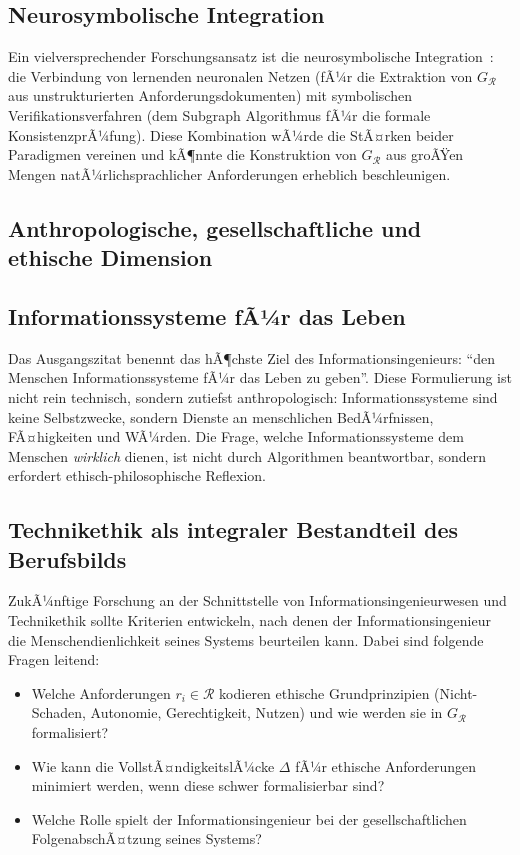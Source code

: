 ﻿\documentclass[a4paper,12pt]{report}
\theoremstyle{definition}
\begin{document}
\subsection{Neurosymbolische Integration}

Ein vielversprechender Forschungsansatz ist die neurosymbolische Integration~\cite{lamb2020}:
die Verbindung von lernenden neuronalen Netzen (fÃ¼r die Extraktion von $G_\mathcal{R}$
aus unstrukturierten Anforderungsdokumenten) mit symbolischen Verifikationsverfahren
(dem Subgraph Algorithmus fÃ¼r die formale KonsistenzprÃ¼fung). Diese Kombination
wÃ¼rde die StÃ¤rken beider Paradigmen vereinen und kÃ¶nnte die Konstruktion von
$G_\mathcal{R}$ aus groÃŸen Mengen natÃ¼rlichsprachlicher Anforderungen erheblich
beschleunigen.

\subsection{Anthropologische, gesellschaftliche und ethische Dimension}

\subsection{Informationssysteme fÃ¼r das Leben}

Das Ausgangszitat benennt das hÃ¶chste Ziel des Informationsingenieurs:
\enquote{den Menschen Informationssysteme fÃ¼r das Leben zu geben}. Diese Formulierung
ist nicht rein technisch, sondern zutiefst anthropologisch: Informationssysteme
sind keine Selbstzwecke, sondern Dienste an menschlichen BedÃ¼rfnissen, FÃ¤higkeiten
und WÃ¼rden. Die Frage, welche Informationssysteme dem Menschen \emph{wirklich} dienen,
ist nicht durch Algorithmen beantwortbar, sondern erfordert ethisch-philosophische
Reflexion.

\subsection{Technikethik als integraler Bestandteil des Berufsbilds}

ZukÃ¼nftige Forschung an der Schnittstelle von Informationsingenieurwesen und Technikethik
sollte Kriterien entwickeln, nach denen der Informationsingenieur die Menschendienlichkeit
seines Systems beurteilen kann. Dabei sind folgende Fragen leitend:
\begin{itemize}
  \item Welche Anforderungen $r_i \in \mathcal{R}$ kodieren ethische Grundprinzipien
        (Nicht-Schaden, Autonomie, Gerechtigkeit, Nutzen) und wie werden sie in
        $G_\mathcal{R}$ formalisiert?
  \item Wie kann die VollstÃ¤ndigkeitslÃ¼cke $\Delta$ fÃ¼r ethische Anforderungen
        minimiert werden, wenn diese schwer formalisierbar sind?
  \item Welche Rolle spielt der Informationsingenieur bei der gesellschaftlichen
        FolgenabschÃ¤tzung seines Systems?
\end{itemize}
\end{document}
